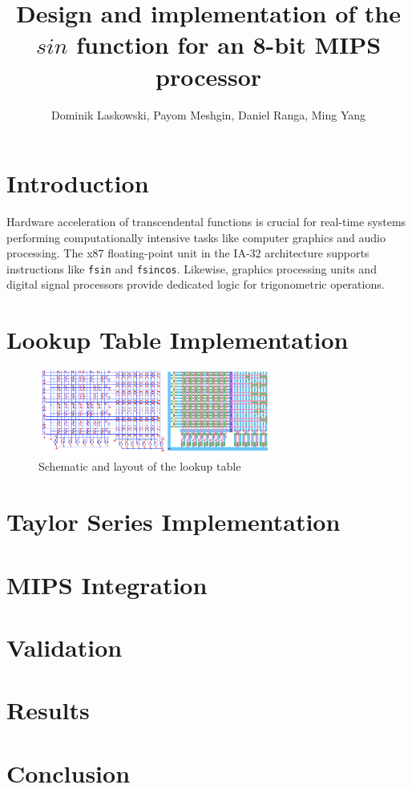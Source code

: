 \documentclass[10pt,journal]{IEEEtran}
\title{Design and implementation of the $sin$ function for an 8-bit MIPS processor}
\author{Dominik Laskowski, Payom Meshgin, Daniel Ranga, Ming Yang}
\begin{document}
\maketitle

\section{Introduction}
Hardware acceleration of transcendental functions is crucial for real-time systems
performing computationally intensive tasks like computer graphics and audio processing.
The x87 floating-point unit in the IA-32 architecture supports instructions like \texttt{fsin}
and \texttt{fsincos}. Likewise, graphics processing units and digital signal processors
provide dedicated logic for trigonometric operations.

\section{Lookup Table Implementation}

\begin{figure}[h]
\centering
\includegraphics[width=3in]{lut.png}
\caption{Schematic and layout of the lookup table}
\label{lut}
\end{figure}

\section{Taylor Series Implementation}

\section{MIPS Integration}

\section{Validation}

\section{Results}

\section{Conclusion}
\end{document}
